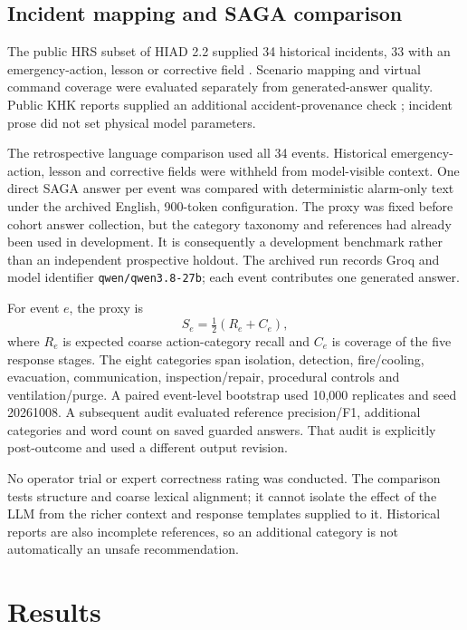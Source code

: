 \documentclass[12pt,a4paper]{article}
\begin{document}
\subsection{Incident mapping and SAGA comparison}
The public HRS subset of HIAD 2.2 supplied 34 historical incidents, 33 with an
emergency-action, lesson or corrective field \cite{hiad2026}. Scenario mapping
and virtual command coverage were evaluated separately from generated-answer
quality. Public KHK reports supplied an additional accident-provenance check
\cite{khk2026}; incident prose did not set physical model parameters.

The retrospective language comparison used all 34 events. Historical
emergency-action, lesson and corrective fields were withheld from model-visible
context. One direct SAGA answer per event was compared with deterministic
alarm-only text under the archived English, 900-token configuration. The proxy
was fixed before cohort answer collection, but the category taxonomy and
references had already been used in development. It is consequently a
development benchmark rather than an independent prospective holdout.
The archived run records Groq and model identifier
\texttt{qwen/qwen3.8-27b}; each event contributes one generated answer.

For event $e$, the proxy is
\begin{equation}
 S_e=\tfrac12(R_e+C_e),
\end{equation}
where $R_e$ is expected coarse action-category recall and $C_e$ is coverage of
the five response stages. The eight categories span isolation, detection,
fire/cooling, evacuation, communication, inspection/repair, procedural controls
and ventilation/purge. A paired event-level bootstrap used 10,000 replicates and
seed 20261008. A subsequent audit evaluated reference precision/F1, additional
categories and word count on saved guarded answers. That audit is explicitly
post-outcome and used a different output revision.

No operator trial or expert correctness rating was conducted. The comparison
tests structure and coarse lexical alignment; it cannot isolate the effect of
the LLM from the richer context and response templates supplied to it. Historical
reports are also incomplete references, so an additional category is not
automatically an unsafe recommendation.

\section{Results}
\end{document}
